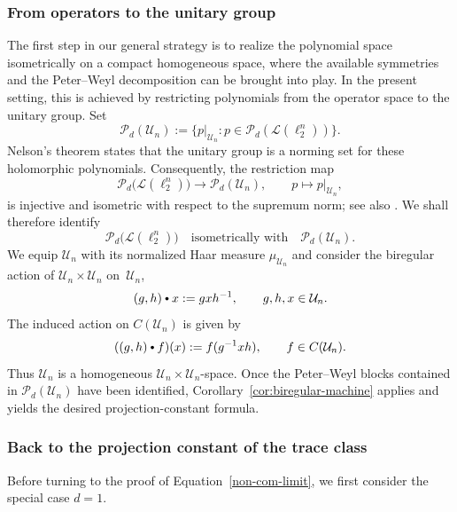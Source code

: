 \documentclass[11pt,showkeys]{amsart}
\newcommand{\hbullet}{\mathbin{\vcenter{\hbox{\scalebox{0.7}{$\bullet$}}}}}
\begin{document}
\subsubsection{From operators to the unitary group}
\label{subsub:operators-to-unitary-group}

The first step in our general strategy is to realize the polynomial
space isometrically on a compact homogeneous space, where the available
symmetries and the Peter--Weyl decomposition can be brought into play.
In the present setting, this is achieved by restricting polynomials
from the operator space to the unitary group.
Set
\[
    \mathcal P_d(\mathcal U_n)
    :=
    \bigl\{
        p|_{\mathcal U_n}:
        p\in\mathcal P_d(\mathcal L(\ell_2^n))
    \bigr\}.
\]
Nelson's theorem \cite{nelson1961distinguished} states that the
unitary group is a norming set for these holomorphic polynomials.
Consequently, the restriction map
\[
    \mathcal P_d\bigl(\mathcal L(\ell_2^n)\bigr)
    \longrightarrow
    \mathcal P_d(\mathcal U_n),
    \qquad
    p\longmapsto p|_{\mathcal U_n},
\]
is injective and isometric with respect to the supremum norm; see also
\cite[Theorem~1]{harris1997holomorphic}. We shall therefore identify
\[
    \mathcal P_d\bigl(\mathcal L(\ell_2^n)\bigr)
    \quad\text{isometrically with}\quad
    \mathcal P_d(\mathcal U_n).
\]
We equip \(\mathcal U_n\) with its normalized Haar measure
\(\mu_{\mathcal U_n}\) and consider the biregular action of
\(\mathcal U_n\times\mathcal U_n\) on~\(\mathcal U_n\),
\[
    (g,h)\hbullet x
    :=
    gxh^{-1},
    \qquad
    g,h,x\in\mathcal U_n.
\]
The induced action on \(C(\mathcal U_n)\) is given by
\[
    ((g,h)\hbullet f)(x)
    :=
    f(g^{-1}xh),
    \qquad
    f\in C(\mathcal U_n).
\]
Thus \(\mathcal U_n\) is a homogeneous
\(\mathcal U_n\times\mathcal U_n\)-space. Once the Peter--Weyl blocks
contained in \(\mathcal P_d(\mathcal U_n)\) have been identified,
Corollary~\ref{cor:biregular-machine} applies and yields the desired
projection-constant formula.




\subsubsection{Back to the projection constant of the trace class}
\label{sec:unitary-trace-class}
Before turning to the proof of Equation~\eqref{non-com-limit}, we first
consider the special case \(d=1\).
\end{document}
